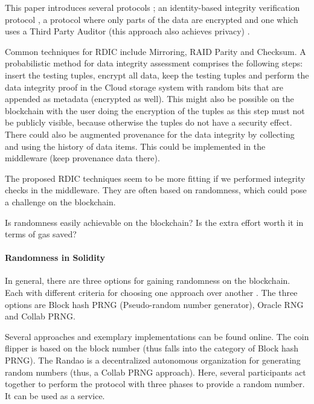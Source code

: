 This paper introduces several protocols \autocite{relatedWork17}; an identity-based integrity verification protocol \autocite{relatedWork18}, a protocol where only parts of the data are encrypted \autocite{relatedWork19} and one which uses a Third Party Auditor (this approach also achieves privacy) \autocite{relatedWork20}.

Common techniques for RDIC include Mirroring, RAID Parity and Checksum. A probabilistic method for data integrity assessment comprises the following steps: insert the testing tuples, encrypt all data, keep the testing tuples and perform the data integrity proof in the Cloud storage system with random bits that are appended as metadata (encrypted as well).
This might also be possible on the blockchain with the user doing the encryption of the tuples as this step must not be publicly visible, because otherwise the tuples do not have a security effect. There could also be augmented provenance for the data integrity by collecting and using the history of data items. This could be implemented in the middleware (keep provenance data there). \autocite{relatedWork21}

The proposed RDIC techniques seem to be more fitting if we performed integrity checks in the middleware. They are often based on randomness, which could pose a challenge on the blockchain.

Is randomness easily achievable on the blockchain? Is the extra effort worth it in terms of gas saved?

\paragraph{Randomness in Solidity}
In general, there are three options for gaining randomness on the blockchain. Each with different criteria for choosing one approach over another \autocite{relatedWork22}. The three options are Block hash PRNG (Pseudo-random number generator), Oracle RNG and Collab PRNG.

Several approaches and exemplary implementations can be found online.
The coin flipper \autocite{relatedWork23} is based on the block number (thus falls into the category of Block hash PRNG). The Randao \autocite{relatedWork24} is a decentralized autonomous organization for generating random numbers (thus, a Collab PRNG approach). Here, several participants act together to perform the protocol with three phases to provide a random number. It can be used as a service.

